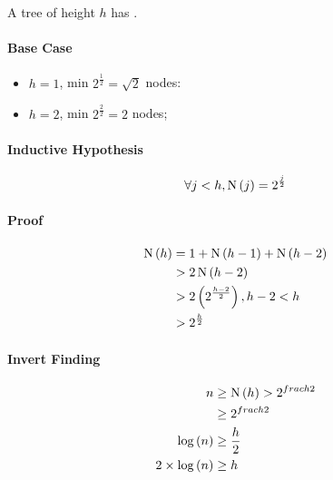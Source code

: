   \begin{theorem}
    A tree of height $ h $ has .
  \end{theorem}
  
  \paragraph{Base Case}
  \begin{itemize}
    \item $ h = 1 $, min $ 2^{ \frac{1}{2} } = \sqrt{2} $ nodes:
    \item $ h = 2 $, min $ 2^{ \frac{2}{2} } = 2 $ nodes;
  \end{itemize}
  
  \paragraph{Inductive Hypothesis}
  \begin{displaymath}
    \forall j < h, \operatorname{N} \left( j \right) = 2^{ \frac{j}{2} }
  \end{displaymath}
  
  \paragraph{Proof}
  \begin{align*}
    \operatorname{N} \left( h \right) &= 1 + \operatorname{N} \left( h - 1 \right) + \operatorname{N} \left( h - 2 \right) \\ 
    &> 2 \operatorname{N} \left( h - 2 \right) \\ 
    &> 2 \left( 2^{ \frac{h - 2}{2} } \right), h - 2 < h \\
    &> 2^{ \frac{h}{2} }
  \end{align*}
  
  \paragraph{Invert Finding}
  \begin{align*}
    n &\geq \operatorname{N} \left( h \right) > 2^{ frac{h}{2} } \\ 
    &\geq 2^{ frac{h}{2} } \\ 
    \log \left( n \right) &\geq \frac{h}{2} \\ 
    2 \times \log \left( n \right) &\geq h
  \end{align*}